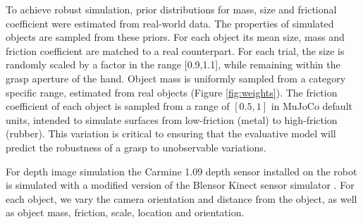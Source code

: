 To achieve robust simulation, prior distributions for mass, size and frictional coefficient were estimated from real-world data. The properties of simulated objects are sampled from these priors. For each object its mean size, mass and friction coefficient are matched to a real counterpart. For each trial, the size is randomly scaled by a factor in the range [0.9,1.1], while remaining within the grasp aperture of the hand. Object mass is uniformly sampled from a category specific range, estimated from real objects (Figure \ref{fig:weights}). The friction coefficient of each object is sampled from a range of $[0.5, 1]$ in MuJoCo default units, intended to simulate surfaces from low-friction (metal) to high-friction (rubber). This variation is critical to ensuring that the evaluative model will predict the robustness of a grasp to unobservable variations.
\begin{table}[]
\centering
\caption{Mass ranges for each object class (grams).}
\label{fig:weights}
\end{table}
 
For depth image simulation the Carmine 1.09 depth sensor installed on the robot is simulated with a modified version of the Blensor Kinect sensor simulator \cite{KinectSimulator}. For each object, we vary the camera orientation and distance from the object, as well as object mass, friction, scale, location and orientation. 

